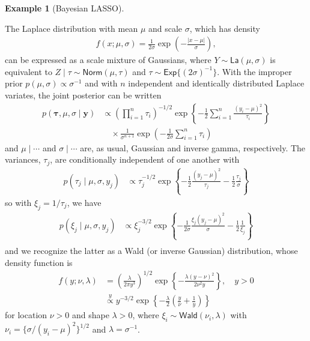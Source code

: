 \documentclass[
  11pt,
  letterpaper,
]{scrbook}
\theoremstyle{definition}
\newtheorem{example}{Example}[chapter]
\theoremstyle{definition}
\theoremstyle{definition}
\theoremstyle{plain}
\theoremstyle{remark}
\begin{document}
\begin{example}[Bayesian
LASSO]\protect\hypertarget{exm-student-mixture-gaussian}{}\label{exm-student-mixture-gaussian}

The Laplace distribution with mean \(\mu\) and scale \(\sigma\), which
has density \begin{align*}
f(x; \mu, \sigma) = \frac{1}{2\sigma}\exp\left(-\frac{|x-\mu|}{\sigma}\right),
\end{align*} can be expressed as a scale mixture of Gaussians, where
\(Y \sim \mathsf{La}(\mu, \sigma)\) is equivalent to
\(Z \mid \tau \sim \mathsf{Norm}(\mu, \tau)\) and
\(\tau \sim \mathsf{Exp}\{(2\sigma)^{-1}\}\). With the improper prior
\(p(\mu, \sigma) \propto \sigma^{-1}\) and with \(n\) independent and
identically distributed Laplace variates, the joint posterior can be
written \begin{align*}
p(\boldsymbol{\tau}, \mu, \sigma \mid \boldsymbol{y}) &\propto \left(\prod_{i=1}^n \tau_i\right)^{-1/2}\exp\left\{-\frac{1}{2}\sum_{i=1}^n \frac{(y_i-\mu)^2}{\tau_i}\right\} \\&\quad \times \frac{1}{\sigma^{n+1}}\exp\left(-\frac{1}{2\sigma}\sum_{i=1}^n \tau_i\right)
\end{align*} and \(\mu \mid \cdots\) and \(\sigma \mid \cdots\) are, as
usual, Gaussian and inverse gamma, respectively. The variances,
\(\tau_j\), are conditionally independent of one another with
\begin{align*}
p(\tau_j \mid \mu, \sigma, y_j) &\propto \tau_j^{-1/2}\exp\left\{-\frac{1}{2}\frac{(y_j-\mu)^2}{\tau_j} -\frac{1}{2} \frac{\tau_j}{\sigma}\right\}
\end{align*} so with \(\xi_j=1/\tau_j\), we have \begin{align*}
p(\xi_j \mid \mu, \sigma, y_j) &\propto \xi_j^{-3/2}\exp\left\{-\frac{1}{2\sigma}\frac{\xi_j(y_j-\mu)^2}{\sigma} -\frac{1}{2} \frac{1}{\xi_j}\right\}\\
\end{align*} and we recognize the latter as a Wald (or inverse Gaussian)
distribution, whose density function is \begin{align*}
f(y; \nu, \lambda) &= \left(\frac{\lambda}{2\pi y^{3}}\right)^{1/2} \exp\left\{ - \frac{\lambda (y-\nu)^2}{2\nu^2y}\right\}, \quad y > 0
\\ &\stackrel{y}{\propto} y^{-3/2}\exp\left\{-\frac{\lambda}{2} \left(\frac{y}{\nu} + \frac{1}{y}\right)\right\}
\end{align*} for location \(\nu >0\) and shape \(\lambda>0\), where
\(\xi_i \sim \mathsf{Wald}(\nu_i, \lambda)\) with
\(\nu_i=\{\sigma/(y_i-\mu)^2\}^{1/2}\) and \(\lambda=\sigma^{-1}\).


\end{example}
\end{document}
